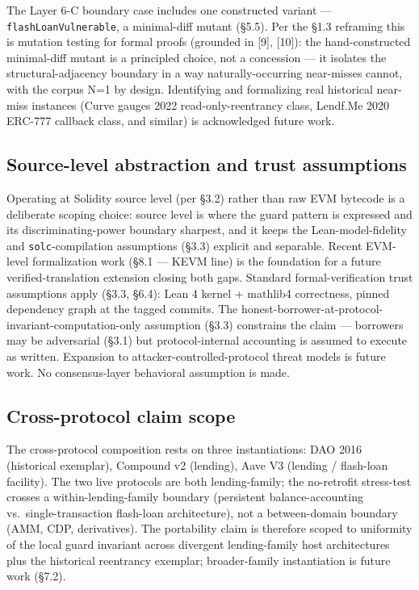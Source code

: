 The Layer 6-C boundary case includes one constructed variant ---
\texttt{flashLoanVulnerable}, a minimal-diff mutant (§5.5). Per the §1.3
reframing this is mutation testing for formal proofs (grounded in
{[}9{]}, {[}10{]}): the hand-constructed minimal-diff mutant is a
principled choice, not a concession --- it isolates the
structural-adjacency boundary in a way naturally-occurring near-misses
cannot, with the corpus N=1 by design. Identifying and formalizing real
historical near-miss instances (Curve gauges 2022 read-only-reentrancy
class, Lendf.Me 2020 ERC-777 callback class, and similar) is
acknowledged future work.

\subsection{Source-level abstraction and trust
assumptions}\label{source-level-abstraction-and-trust-assumptions}

Operating at Solidity source level (per §3.2) rather than raw EVM
bytecode is a deliberate scoping choice: source level is where the guard
pattern is expressed and its discriminating-power boundary sharpest, and
it keeps the Lean-model-fidelity and \texttt{solc}-compilation
assumptions (§3.3) explicit and separable. Recent EVM-level
formalization work (§8.1 --- KEVM line) is the foundation for a future
verified-translation extension closing both gaps. Standard
formal-verification trust assumptions apply (§3.3, §6.4): Lean 4 kernel
+ mathlib4 correctness, pinned dependency graph at the tagged commits.
The honest-borrower-at-protocol-invariant-computation-only assumption
(§3.3) constrains the claim --- borrowers may be adversarial (§3.1) but
protocol-internal accounting is assumed to execute as written. Expansion
to attacker-controlled-protocol threat models is future work. No
consensus-layer behavioral assumption is made.

\subsection{Cross-protocol claim
scope}\label{cross-protocol-claim-scope}

The cross-protocol composition rests on three instantiations: DAO 2016
(historical exemplar), Compound v2 (lending), Aave V3 (lending /
flash-loan facility). The two live protocols are both lending-family;
the no-retrofit stress-test crosses a within-lending-family boundary
(persistent balance-accounting vs.~single-transaction flash-loan
architecture), not a between-domain boundary (AMM, CDP, derivatives).
The portability claim is therefore scoped to uniformity of the local
guard invariant across divergent lending-family host architectures plus
the historical reentrancy exemplar; broader-family instantiation is
future work (§7.2).

